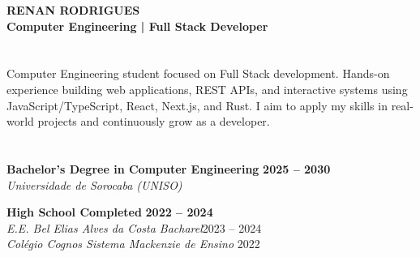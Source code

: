 \documentclass[,a4paper]{article}
\begin{document}
\begin{minipage}[t]{11.5cm} %
  \vspace{1.2cm}
  {\Huge \textbf{\color{white} RENAN RODRIGUES}} \\
  \vspace{0.2cm}
  {\hspace*{1cm}\large\textbf{ \color{white!80} Computer Engineering | Full Stack Developer}}

  \vspace{1.4cm}

  \begin{minipage}{11.0cm}
    \section*{\hspace*{0.5cm}\vspace{-0.4cm}\color{mainpurple}{\faIdCard \quad SUMMARY}}
    \vspace{0.2cm}
    {\normalsize \color{textgray} Computer Engineering student focused on Full Stack development. Hands-on experience building web applications, REST APIs, and interactive systems using JavaScript/TypeScript, React, Next.js, and Rust. I aim to apply my skills in real-world projects and continuously grow as a developer.\par}
    \vspace*{-0.2cm}
    \section*{\hspace*{0.5cm}\color{mainpurple}{\faGraduationCap \quad EDUCATION}}
    \noindent \textbf{Bachelor's Degree in Computer Engineering} \hfill \textbf{2025 -- 2030} \\
    \textit{\color{textgray}Universidade de Sorocaba (UNISO)}\par
    \vspace{0.3cm}
    \noindent \textbf{High School Completed} \hfill \textbf{2022 -- 2024} \\
    \textit{\color{textgray}E.E. Bel Elias Alves da Costa Bacharel}{\color{textgray}\hfill{2023 -- 2024}}\\
    \textit{\color{textgray}Colégio Cognos Sistema Mackenzie de Ensino} {\color{textgray}\hfill{2022}}
    \vspace*{-0.2cm}

\end{minipage}
\end{minipage}
\end{document}
